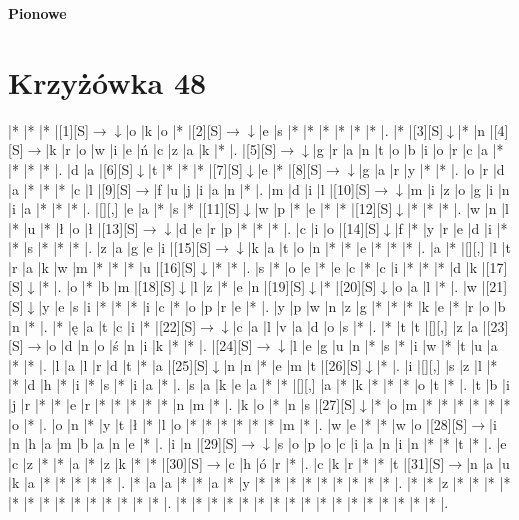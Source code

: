 \documentclass[11pt]{article}
\newcommand\drarr{$\rightarrow \!\!\!\!\! \downarrow$}
\newcommand\rarr{$\rightarrow$}
\newcommand\darr{$\downarrow$}
\begin{document}
\begin{PuzzleClues}{\textbf{Pionowe}\\}
\end{PuzzleClues}\newpage\section*{Krzyżówka 48}

\noindent\begin{Puzzle}{16}{30}|*	|*	|*	|[1][S]\drarr	|o	|k	|o	|*	|[2][S]\drarr	|e	|s	|*	|*	|*	|*	|*	|*	|.
|*	|[3][S]\darr	|*	|n	|[4][S]\rarr	|k	|r	|o	|w	|i	|e	|ń	|c	|z	|a	|k	|*	|.
|[5][S]\drarr	|g	|r	|a	|n	|t	|o	|b	|i	|o	|r	|c	|a	|*	|*	|*	|*	|.
|d	|a	|[6][S]\darr	|t	|*	|*	|*	|[7][S]\darr	|e	|*	|[8][S]\drarr	|g	|a	|r	|y	|*	|*	|.
|o	|r	|d	|a	|*	|*	|*	|c	|l	|[9][S]\rarr	|f	|u	|j	|i	|a	|n	|*	|.
|m	|d	|i	|l	|[10][S]\drarr	|m	|i	|z	|o	|g	|i	|n	|i	|a	|*	|*	|*	|.
|[][,]{ }	|e	|a	|*	|s	|*	|[11][S]\darr	|w	|p	|*	|e	|*	|*	|[12][S]\darr	|*	|*	|*	|.
|w	|n	|l	|*	|u	|*	|ł	|o	|ł	|[13][S]\drarr	|d	|e	|r	|p	|*	|*	|*	|.
|c	|i	|o	|[14][S]\darr	|f	|*	|y	|r	|e	|d	|i	|*	|*	|s	|*	|*	|*	|.
|z	|a	|g	|e	|i	|[15][S]\drarr	|k	|a	|t	|o	|n	|*	|*	|e	|*	|*	|*	|.
|a	|*	|[][,]{ }	|l	|t	|r	|a	|k	|w	|m	|*	|*	|*	|u	|[16][S]\darr	|*	|*	|.
|s	|*	|o	|e	|*	|e	|c	|*	|c	|i	|*	|*	|*	|d	|k	|[17][S]\darr	|*	|.
|o	|*	|b	|m	|[18][S]\darr	|l	|z	|*	|e	|n	|[19][S]\darr	|*	|[20][S]\darr	|o	|a	|l	|*	|.
|w	|[21][S]\darr	|y	|e	|s	|i	|*	|*	|*	|i	|c	|*	|o	|p	|r	|e	|*	|.
|y	|p	|w	|n	|z	|g	|*	|*	|*	|k	|e	|*	|r	|o	|b	|n	|*	|.
|*	|ę	|a	|t	|c	|i	|*	|[22][S]\drarr	|c	|a	|l	|v	|a	|d	|o	|s	|*	|.
|*	|t	|t	|[][,]{ }	|z	|a	|[23][S]\rarr	|o	|d	|n	|o	|ś	|n	|i	|k	|*	|*	|.
|[24][S]\drarr	|l	|e	|g	|u	|n	|*	|s	|*	|i	|w	|*	|t	|u	|a	|*	|*	|.
|l	|a	|l	|r	|d	|t	|*	|a	|[25][S]\darr	|n	|n	|*	|e	|m	|t	|[26][S]\darr	|*	|.
|i	|[][,]{ }	|s	|z	|l	|*	|*	|d	|h	|*	|i	|*	|s	|*	|i	|a	|*	|.
|s	|a	|k	|e	|a	|*	|*	|[][,]{ }	|a	|*	|k	|*	|*	|*	|o	|t	|*	|.
|t	|b	|i	|j	|r	|*	|*	|e	|r	|*	|*	|*	|*	|*	|n	|m	|*	|.
|k	|o	|*	|n	|s	|[27][S]\darr	|*	|o	|m	|*	|*	|*	|*	|*	|*	|o	|*	|.
|o	|n	|*	|y	|t	|ł	|*	|l	|o	|*	|*	|*	|*	|*	|*	|m	|*	|.
|w	|e	|*	|*	|w	|o	|[28][S]\rarr	|i	|n	|h	|a	|m	|b	|a	|n	|e	|*	|.
|i	|n	|[29][S]\drarr	|s	|o	|p	|o	|c	|i	|a	|n	|i	|n	|*	|*	|t	|*	|.
|e	|c	|z	|*	|*	|a	|*	|z	|k	|*	|*	|[30][S]\rarr	|c	|h	|ó	|r	|*	|.
|c	|k	|r	|*	|*	|t	|[31][S]\rarr	|n	|a	|u	|k	|a	|*	|*	|*	|*	|*	|.
|*	|a	|a	|*	|*	|a	|*	|y	|*	|*	|*	|*	|*	|*	|*	|*	|*	|.
|*	|*	|z	|*	|*	|*	|*	|*	|*	|*	|*	|*	|*	|*	|*	|*	|*	|.
|*	|*	|*	|*	|*	|*	|*	|*	|*	|*	|*	|*	|*	|*	|*	|*	|*	|.\end{Puzzle}
\end{document}
